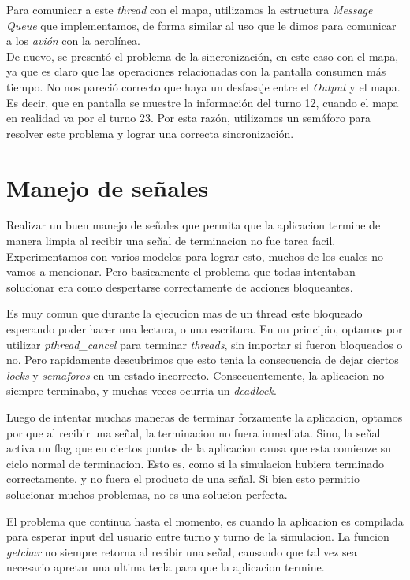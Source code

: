 \documentclass[a4paper,10pt]{article}
\begin{document}
Para comunicar a este \textit{thread} con el mapa, utilizamos la estructura \textit{Message Queue} que implementamos, de forma similar al uso que le dimos 
para comunicar a los \textit{avión} con la aerolínea.\\

De nuevo, se presentó el problema de la sincronización, en este caso con el mapa, ya que es claro que las operaciones relacionadas con la pantalla consumen más 
tiempo. No nos pareció correcto que haya un desfasaje entre el \textit{Output} y el mapa. Es decir, que en pantalla se muestre la información del turno 12, 
cuando el mapa en realidad va por el turno 23. Por esta razón, utilizamos un semáforo para resolver este problema y lograr una correcta sincronización.

\newpage
\section{Manejo de señales}
Realizar un buen manejo de señales que permita que la aplicacion termine de manera limpia al recibir una señal de terminacion no fue tarea facil.
Experimentamos con varios modelos para lograr esto, muchos de los cuales no vamos a mencionar.
Pero basicamente el problema que todas intentaban solucionar era como despertarse correctamente de acciones bloqueantes.

Es muy comun que durante la ejecucion mas de un thread este bloqueado esperando poder hacer una lectura, o una escritura.
En un principio, optamos por utilizar \textit{pthread_cancel} para terminar \textit{threads}, sin importar si fueron bloqueados o no.
Pero rapidamente descubrimos que esto tenia la consecuencia de dejar ciertos \textit{locks} y \textit{semaforos} en un estado incorrecto.
Consecuentemente, la aplicacion no siempre terminaba, y muchas veces ocurria un \textit{deadlock}.

Luego de intentar muchas maneras de terminar forzamente la aplicacion, optamos por que al recibir una señal, la terminacion no fuera inmediata.
Sino, la señal activa un flag que en ciertos puntos de la aplicacion causa que esta comienze su ciclo normal de terminacion.
Esto es, como si la simulacion hubiera terminado correctamente, y no fuera el producto de una señal.
Si bien esto permitio solucionar muchos problemas, no es una solucion perfecta.

El problema que continua hasta el momento, es cuando la aplicacion es compilada para esperar input del usuario entre turno y turno de la simulacion. 
La funcion \textit{getchar} no siempre retorna al recibir una señal, causando que tal vez sea necesario apretar una ultima tecla para que la aplicacion termine.
\end{document}
